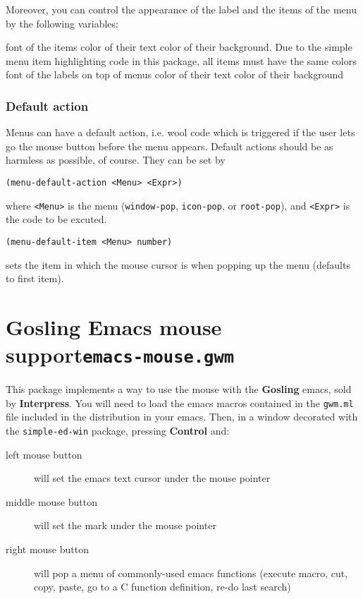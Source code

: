 Moreover, you can control the appearance of the label and the items of the 
menu by the following variables:

\begin{description}
 font of the items
 color of their text
 color of their background. Due to the simple menu
item  highlighting code in this package, all items must have the same colors
 font of the labels on top of menus
 color of their text
 color of their background
\end{description}

\subsubsection{Default action}

Menus can have a default action, i.e. wool code which is triggered if the user
lets go the mouse button before the menu appears. Default actions should be as
harmless as possible, of course. They can be set by 

\begin{verbatim}
(menu-default-action <Menu> <Expr>)
\end{verbatim}
where \verb|<Menu>| is the menu (\verb"window-pop", \verb"icon-pop", or
\verb"root-pop"), and \verb|<Expr>| is the code to be excuted.

\begin{verbatim}
(menu-default-item <Menu> number)
\end{verbatim}
sets the item in which the mouse cursor is when popping up the menu (defaults
to first item).

\section{Gosling Emacs mouse support\hfill{\tt emacs-mouse.gwm}}
\label{emacs-mouse}

This package implements a way to use the mouse with the {\bf Gosling} emacs,
sold by {\bf Interpress}. You will need to load the emacs macros contained
in the {\tt gwm.ml} file included in the distribution in your emacs. Then,
in a window decorated with the {\tt simple-ed-win} package, pressing
{\bf Control} and:

\begin{description}
\item[left mouse button] will set the emacs text cursor under the mouse
pointer
\item[middle mouse button] will set the mark under the mouse pointer
\item[right mouse button] will pop a menu of commonly-used emacs functions
(execute macro, cut, copy, paste, go to a C function definition, re-do last
search)
\end{description}


